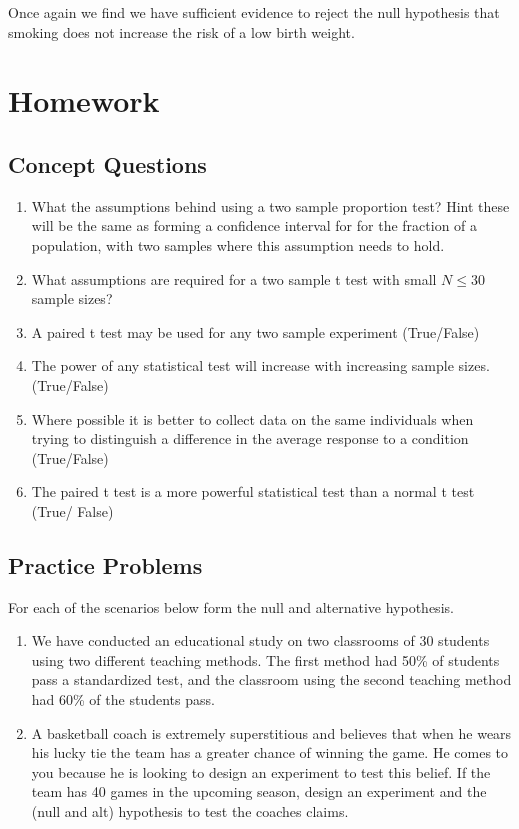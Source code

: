 \documentclass[
]{book}
\providecommand{\tightlist}{%
  \setlength{\itemsep}{0pt}\setlength{\parskip}{0pt}}
\theoremstyle{definition}
\theoremstyle{definition}
\theoremstyle{definition}
\theoremstyle{definition}
\theoremstyle{remark}
\begin{document}
Once again we find we have sufficient evidence to reject the null hypothesis that smoking does not increase the risk of a low birth weight.

\hypertarget{homework-13}{%
\section{Homework}\label{homework-13}}

\hypertarget{concept-questions-12}{%
\subsection{Concept Questions}\label{concept-questions-12}}

\begin{enumerate}
\def\labelenumi{\arabic{enumi}.}
\tightlist
\item
  What the assumptions behind using a two sample proportion test? Hint these will be the same as forming a confidence interval for for the fraction of a population, with two samples where this assumption needs to hold.
\item
  What assumptions are required for a two sample t test with small \(N\leq 30\) sample sizes?
\item
  A paired t test may be used for any two sample experiment (True/False)
\item
  The power of any statistical test will increase with increasing sample sizes. (True/False)
\item
  Where possible it is better to collect data on the same individuals when trying to distinguish a difference in the average response to a condition (True/False)
\item
  The paired t test is a more powerful statistical test than a normal t test (True/ False)
\end{enumerate}

\hypertarget{practice-problems-13}{%
\subsection{Practice Problems}\label{practice-problems-13}}

For each of the scenarios below form the null and alternative hypothesis.

\begin{enumerate}
\def\labelenumi{\arabic{enumi}.}
\tightlist
\item
  We have conducted an educational study on two classrooms of 30 students using two different teaching methods. The first method had 50\% of students pass a standardized test, and the classroom using the second teaching method had 60\% of the students pass.
\item
  A basketball coach is extremely superstitious and believes that when he wears his lucky tie the team has a greater chance of winning the game. He comes to you because he is looking to design an experiment to test this belief. If the team has 40 games in the upcoming season, design an experiment and the (null and alt) hypothesis to test the coaches claims.
\end{enumerate}
\end{document}
